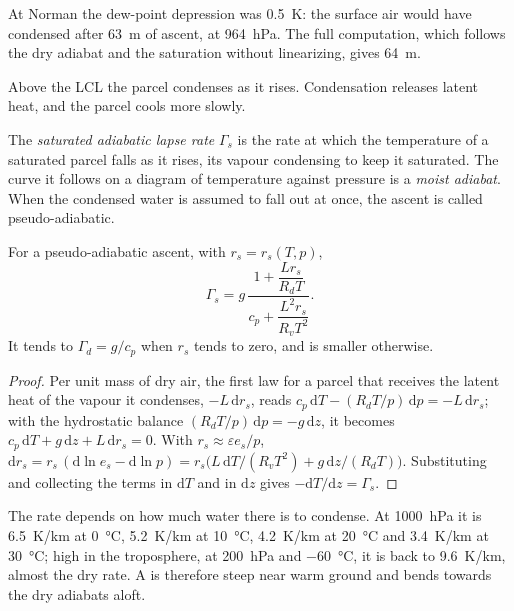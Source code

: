 At Norman the dew-point depression was \qty{0.5}{K}: the surface air would have condensed after
\qty{63}{m} of ascent, at \qty{964}{hPa}. The full computation, which follows the dry adiabat and
the saturation  without linearizing, gives \qty{64}{m}.

Above the LCL the parcel condenses as it rises. Condensation releases latent heat, and the parcel
cools more slowly.

\begin{definition}\label{def:b2:atmospheric-thermodynamics:moist-adiabat}
The \emph{saturated adiabatic lapse rate} $\Gamma_s$ is
the rate at which the temperature of a saturated parcel falls as it rises, its vapour condensing
to keep it saturated. The curve it follows on a diagram of temperature against pressure is a
\emph{moist adiabat}. When the condensed water is assumed to fall out at
once, the ascent is called pseudo-adiabatic.
\end{definition}

\begin{proposition}\label{prop:b2:atmospheric-thermodynamics:gamma-s}
For a pseudo-adiabatic ascent, with $r_s = r_s(T, p)$,
\[
  \Gamma_s = g\,\frac{1 + \dfrac{L r_s}{R_d T}}{c_p + \dfrac{L^2 r_s}{R_v T^2}} .
\]
It tends to $\Gamma_d = g/c_p$ when $r_s$ tends to zero, and is smaller otherwise.
\end{proposition}

\begin{proof}
Per unit mass of dry air, the first law for a parcel that receives the latent heat of the vapour
it condenses, $-L\,\mathrm{d}r_s$, reads $c_p\,\mathrm{d}T - (R_dT/p)\,\mathrm{d}p = -L\,
\mathrm{d}r_s$; with the hydrostatic balance $(R_dT/p)\,\mathrm{d}p = -g\,\mathrm{d}z$, it becomes
$c_p\,\mathrm{d}T + g\,\mathrm{d}z + L\,\mathrm{d}r_s = 0$. With $r_s \approx \varepsilon e_s/p$,
$\mathrm{d}r_s = r_s\,(\mathrm{d}\ln e_s - \mathrm{d}\ln p) = r_s\bigl(L\,\mathrm{d}T/(R_vT^2) +
g\,\mathrm{d}z/(R_dT)\bigr)$. Substituting and collecting the terms in $\mathrm{d}T$ and in
$\mathrm{d}z$ gives $-\mathrm{d}T/\mathrm{d}z = \Gamma_s$.
\end{proof}

The rate depends on how much water there is to condense. At \qty{1000}{hPa} it is
\qty{6.5}{K/km} at \qty{0}{\celsius}, \qty{5.2}{K/km} at \qty{10}{\celsius}, \qty{4.2}{K/km} at
\qty{20}{\celsius} and \qty{3.4}{K/km} at \qty{30}{\celsius}; high in the troposphere, at
\qty{200}{hPa} and \qty{-60}{\celsius}, it is back to \qty{9.6}{K/km}, almost the dry rate. A
 is therefore steep near warm ground and bends towards the dry adiabats aloft.

